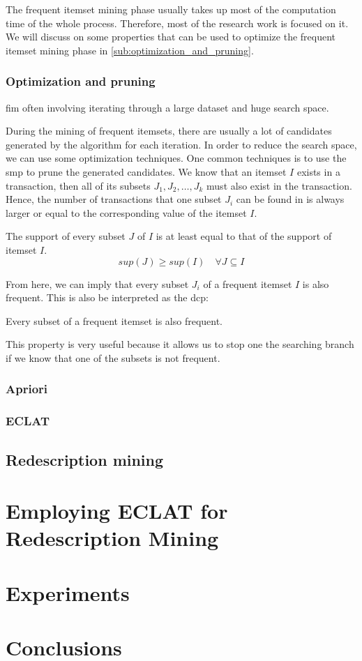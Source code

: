 The frequent itemset mining phase usually takes up most of the computation time of the whole process.
Therefore, most of the research work is focused on it.
We will discuss on some properties that can be used to optimize the frequent itemset mining phase in \autoref{sub:optimization_and_pruning}.
\subsection{Optimization and pruning}
\label{sub:optimization_and_pruning}
\Acl{fim} often involving iterating through a large dataset and huge search space.

During the mining of frequent itemsets, there are usually a lot of candidates generated by the algorithm for each iteration.
In order to reduce the search space, we can use some optimization techniques.
One common techniques is to use the \acl{smp} to prune the generated candidates.
We know that an itemset $I$ exists in a transaction, then all of its subsets $J_1, J_2, \dots, J_k$ must also exist in the transaction.
Hence, the number of transactions that one subset $J_i$ can be found in is always larger or equal to the corresponding value of the itemset $I$.
\begin{definition}
    The support of every subset $J$ of $I$ is at least equal to that of the support of itemset $I$.
    \begin{equation}
        sup(J) \geq sup(I) \quad \forall J \subseteq I
    \end{equation}
\end{definition}

From here, we can imply that every subset $J_i$ of a frequent itemset $I$ is also frequent.
This is also be interpreted as the \acl{dcp}:
\begin{definition}
    Every subset of a frequent itemset is also frequent.
\end{definition}
This property is very useful because it allows us to stop one the searching branch if we know that one of the subsets is not frequent.
\subsection{Apriori}
\subsection{ECLAT}

\section{Redescription mining}


\chapter{Employing ECLAT for Redescription Mining}
\label{cha:employment}

\chapter{Experiments}
\label{cha:experiments}

\chapter{Conclusions}
\label{cha:conclusions}